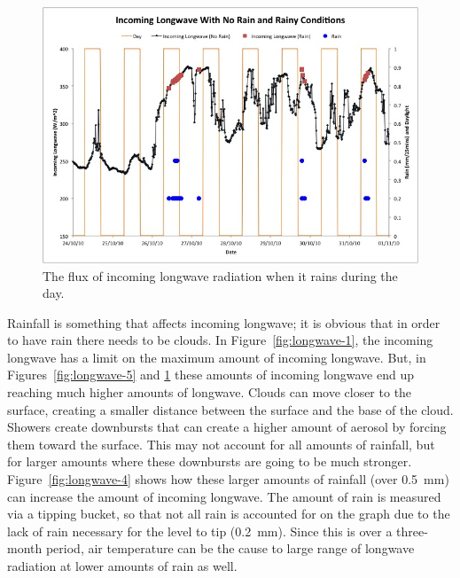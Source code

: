 \documentclass[a4paper,titlepage, twoside]{report}
\begin{document}
\begin{figure}
\includegraphics[width=\textwidth]{6.jpg}
\caption{The flux of incoming longwave radiation when it rains during the day.}
\label{fig:longwave-6}
\end{figure}

Rainfall is something that affects incoming longwave; it is obvious that in order to have rain there needs to be clouds.  In Figure~\ref{fig:longwave-1}, the incoming longwave has a limit on the maximum amount of incoming longwave.  But, in Figures~\ref{fig:longwave-5} and \ref{fig:longwave-6} these amounts of incoming longwave end up reaching much higher amounts of longwave.  Clouds can move closer to the surface, creating a smaller distance between the surface and the base of the cloud.  Showers create downbursts that can create a higher amount of aerosol by forcing them toward the surface.  This may not account for all amounts of rainfall, but for larger amounts where these downbursts are going to be much stronger.  Figure~\ref{fig:longwave-4} shows how these larger amounts of rainfall (over \SI{0.5}{\milli\meter}) can increase the amount of incoming longwave.  The amount of rain is measured via a tipping bucket, so that not all rain is accounted for on the graph due to the lack of rain necessary for the level to tip (\SI{0.2}{\milli\meter}).  Since this is over a three-month period, air temperature can be the cause to large range of longwave radiation at lower amounts of rain as well.
\end{document}
